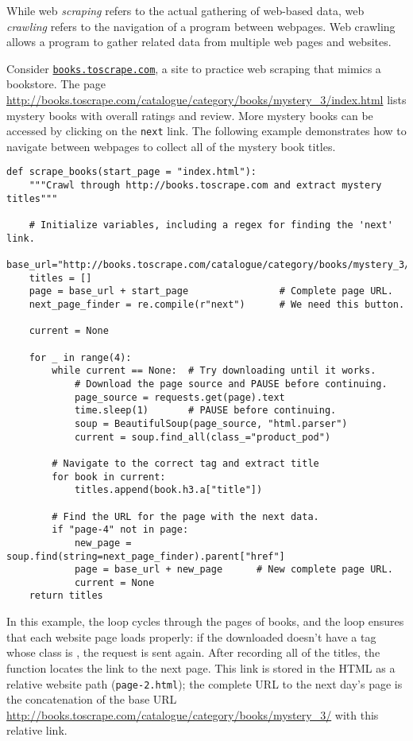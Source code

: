 While web \emph{scraping} refers to the actual gathering of web-based data, web \emph{crawling} refers to the navigation of a program between webpages.
Web crawling allows a program to gather related data from multiple web pages and websites.

Consider \href{http://books.toscrape.com}{\texttt{books.toscrape.com}}, a site to practice web scraping that mimics a bookstore.
The page \url{http://books.toscrape.com/catalogue/category/books/mystery_3/index.html} lists mystery books with overall ratings and review.
More mystery books can be accessed by clicking on the \texttt{next} link.
The following example demonstrates how to navigate between webpages to collect all of the mystery book titles.

\begin{lstlisting}
def scrape_books(start_page = "index.html"):
    """Crawl through http://books.toscrape.com and extract mystery titles"""

    # Initialize variables, including a regex for finding the 'next' link.
    base_url="http://books.toscrape.com/catalogue/category/books/mystery_3/"
    titles = []
    page = base_url + start_page                # Complete page URL.
    next_page_finder = re.compile(r"next")      # We need this button.

    current = None

    for _ in range(4):
        while current == None:  # Try downloading until it works.
            # Download the page source and PAUSE before continuing.
            page_source = requests.get(page).text
            time.sleep(1)       # PAUSE before continuing.
            soup = BeautifulSoup(page_source, "html.parser")
            current = soup.find_all(class_="product_pod")

        # Navigate to the correct tag and extract title
        for book in current:
            titles.append(book.h3.a["title"])

        # Find the URL for the page with the next data.
        if "page-4" not in page:
            new_page = soup.find(string=next_page_finder).parent["href"]
            page = base_url + new_page      # New complete page URL.
            current = None
    return titles

\end{lstlisting}

In this example, the  loop cycles through the pages of books, and the  loop ensures that each website page loads properly: if the downloaded  doesn't have a tag whose class is , the request is sent again.
After recording all of the titles, the function locates the link to the next page.
This link is stored in the HTML as a relative website path (\texttt{page-2.html}); the complete URL to the next day's page is the concatenation of the base URL \url{http://books.toscrape.com/catalogue/category/books/mystery_3/} with this relative link.

